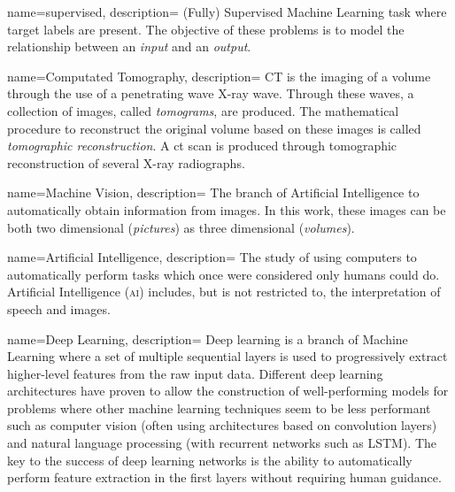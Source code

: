 {
        name={supervised},
        description={
                (Fully) Supervised Machine Learning task where target labels are present. 
                The objective of these problems is to model the relationship between an \textit{input} and an \textit{output}.
                }
}

{
        name={Computated Tomography},
        description={
                CT is the imaging of a volume through the use of a penetrating wave X-ray wave. 
                Through these waves, a collection of images, called \textit{tomograms}, are produced.
                The mathematical procedure to reconstruct the original volume based on these images is called \textit{tomographic reconstruction}.
                A \acrfull{ct} scan is produced through tomographic reconstruction of several X-ray radiographs.
                }
}

{
        name={Machine Vision},
        description={
                The branch of Artificial Intelligence to automatically obtain information from images. 
                In this work, these images can be both two dimensional (\textit{pictures}) as three dimensional (\textit{volumes}).
                }
}

{
        name={Artificial Intelligence},
        description={
                The study of using computers to automatically perform tasks which once were considered only humans could do.
                Artificial Intelligence (\textsc{ai}) includes, but is not restricted to, the interpretation of speech and images.
                }
}

{
        name={Deep Learning},
        description={
                Deep learning is a branch of Machine Learning where a set of multiple sequential layers is used to progressively extract higher-level features from the raw input data.
                Different deep learning architectures have proven to allow the construction of well-performing models for problems where other machine learning techniques seem to be less performant such as
                computer vision (often using architectures based on convolution layers) and natural language processing (with recurrent networks such as LSTM). 
                The key to the success of deep learning networks is the ability to automatically perform feature extraction in the first layers without requiring human guidance.
                }
}

